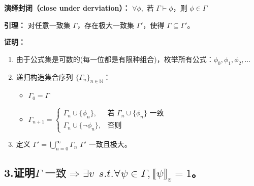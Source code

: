 \documentclass[12pt, a4paper]{article}
\begin{document}
\vspace{0.3cm}
\textbf{演绎封闭（close under derviation）：}
$\forall \phi, \text{ 若 } \Gamma \vdash \phi \text{，则 } \phi \in \Gamma$


\textbf{引理：} 对任意一致集 $\Gamma$，存在极大一致集 $\Gamma'$，使得 $\Gamma \subseteq \Gamma'$。

\textbf{证明：}
\begin{enumerate}
    \item 由于公式集是可数的(每一位都是有限种组合)，枚举所有公式：$\phi_0, \phi_1, \phi_2, \dots$
    \item 递归构造集合序列 $\{\Gamma_n\}_{n \in \mathbb{N}}$：
    \begin{itemize}
        \item $\Gamma_0 = \Gamma$
        \item $\Gamma_{n+1} = 
        \begin{cases} 
        \Gamma_n \cup \{\phi_n\}, & \text{若 } \Gamma_n \cup \{\phi_n\} \text{ 一致} \\
        \Gamma_n \cup \{\neg \phi_n\}, & \text{否则}
        \end{cases}$
    \end{itemize}
    \item 定义 $\Gamma' = \bigcup\limits_{n=0}^{\infty} \Gamma_n$  $\Gamma'$ 一致且极大。
\end{enumerate}

\subsection*{3.证明$\Gamma \text{ 一致} \Rightarrow \exists v \ \  s.t. \forall \psi \in \Gamma, \llbracket \psi \rrbracket_v = 1$。}
\end{document}
